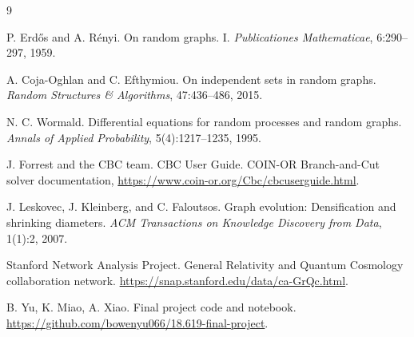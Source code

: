 \documentclass[11pt]{article}
\begin{document}
\begin{thebibliography}{9}

P. Erdős and A. Rényi.
\newblock On random graphs. I.
\newblock \emph{Publicationes Mathematicae}, 6:290--297, 1959.

A. Coja-Oghlan and C. Efthymiou.
\newblock On independent sets in random graphs.
\newblock \emph{Random Structures \& Algorithms}, 47:436--486, 2015.

N. C. Wormald.
\newblock Differential equations for random processes and random graphs.
\newblock \emph{Annals of Applied Probability}, 5(4):1217--1235, 1995.

J. Forrest and the CBC team.
\newblock CBC User Guide.
\newblock COIN-OR Branch-and-Cut solver documentation,
\url{https://www.coin-or.org/Cbc/cbcuserguide.html}.

J. Leskovec, J. Kleinberg, and C. Faloutsos.
\newblock Graph evolution: Densification and shrinking diameters.
\newblock \emph{ACM Transactions on Knowledge Discovery from Data}, 1(1):2,
2007.

Stanford Network Analysis Project.
\newblock General Relativity and Quantum Cosmology collaboration network.
\newblock \url{https://snap.stanford.edu/data/ca-GrQc.html}.

B. Yu, K. Miao, A. Xiao.
 Final project code and notebook.
\newblock \url{https://github.com/bowenyu066/18.619-final-project}.

\end{thebibliography}
\end{document}

